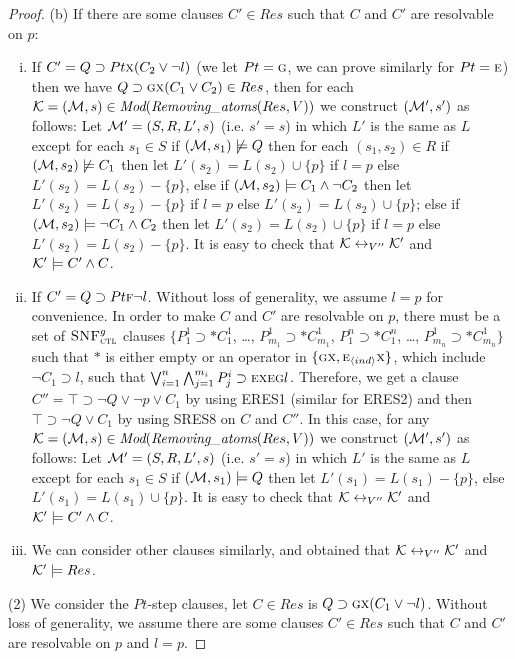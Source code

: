 \documentclass[letterpaper]{article} %
\begin{document}
\begin{proof}
(b) If there are some clauses $C'\in Res$ such that $C$ and $C'$ are resolvable on $p$:
\begin{enumerate}[(i)]
    \item If $C'= Q\supset Pt \textsc{x} (C_2 \vee \neg l)$ (we let $Pt=\textsc{g}$, we can prove similarly for $Pt = \textsc{e}$) then we have $Q\supset \textsc{g} \textsc{x}(C_1 \vee C_2) \in Res$, then for each ${\cal K}=({\cal M}, s)\in \textit{Mod}(\emph{Removing\_atoms}(Res, V))$ we construct $({\cal M}',s')$ as follows: Let ${\cal M}'= (S, R, L',s)$ (i.e. $s'=s$) in which $L'$ is the same as $L$ except for each $s_1\in S$ if $({\cal M}, s_1) \not \models Q$ then for each $(s_1, s_2) \in R$ if $({\cal M}, s_2) \not \models C_1$ then let $L'(s_2) = L(s_2) \cup \{p\}$ if $l=p$ else $L'(s_2) = L(s_2) - \{p\}$, else if $({\cal M}, s_2) \models  C_1 \wedge \neg C_2$ then let $L'(s_2) = L(s_2) - \{p\}$ if $l=p$ else $L'(s_2) = L(s_2) \cup \{p\}$; else if $({\cal M}, s_2) \models \neg C_1 \wedge C_2$ then let $L'(s_2) = L(s_2) \cup \{p\}$ if $l=p$ else $L'(s_2) = L(s_2) - \{p\}$. It is easy to check that ${\cal K} \leftrightarrow_{V''} {\cal K}'$ and ${\cal K}' \models C' \wedge C$.
    \item If $C' =  Q\supset Pt \textsc{f} \neg l$. Without loss of generality, we assume $l=p$ for convenience. In order to make $C$ and $C'$ are resolvable on $p$, there must be a set of ${\textsc{SNF}_{\textsc{ctl}}^g}$ clauses $\{P_1^1 \supset * C_1^1$, \dots, $P_{m_1}^1 \supset * C_{m_1}^1$, $P_1^n \supset * C_1^n$, \dots, $P_{m_n}^1 \supset * C_{m_n}^1 \}$ such that $*$ is either empty or
an operator in $\{\textsc{g} \textsc{x}, \textsc{e}_{{\langle{ind}\rangle}} \textsc{x}\}$, which include $\neg C_1 \supset l$, such that $\bigvee_{i=1}^n \bigwedge_{j=1}^{m_i} P_j^i \supset \textsc{e} \textsc{x} \textsc{e} \textsc{g} l$. Therefore, we get a clause $C''=\top \supset \neg Q \vee \neg p \vee C_1$ by using ERES1 (similar for ERES2) and then $\top \supset \neg Q \vee C_1$ by using SRES8 on $C$ and $C''$. In this case, for any ${\cal K}=({\cal M}, s)\in \textit{Mod}(\emph{Removing\_atoms}(Res, V))$ we construct $({\cal M}',s')$ as follows: Let ${\cal M}'= (S, R, L',s)$ (i.e. $s'=s$) in which $L'$ is the same as $L$ except for each $s_1\in S$ if $({\cal M}, s_1) \models Q$ then let $L'(s_1) = L(s_1) - \{p\}$, else $L'(s_1) = L(s_1) \cup \{p\}$. It is easy to check that ${\cal K} \leftrightarrow_{V''} {\cal K}'$ and ${\cal K}' \models C' \wedge C$.   
    \item We can consider other clauses similarly, and obtained that ${\cal K} \leftrightarrow_{V''} {\cal K}'$ and ${\cal K}' \models Res$. 
\end{enumerate}
 
(2) We consider the $Pt$-step clauses, let $C\in Res$ is $Q \supset \textsc{g} \textsc{x}(C_1 \vee \neg l)$. Without loss of generality, we assume there are some clauses $C'\in Res$ such that $C$ and $C'$ are resolvable on $p$ and $l=p$.


\end{proof}
\end{document}
